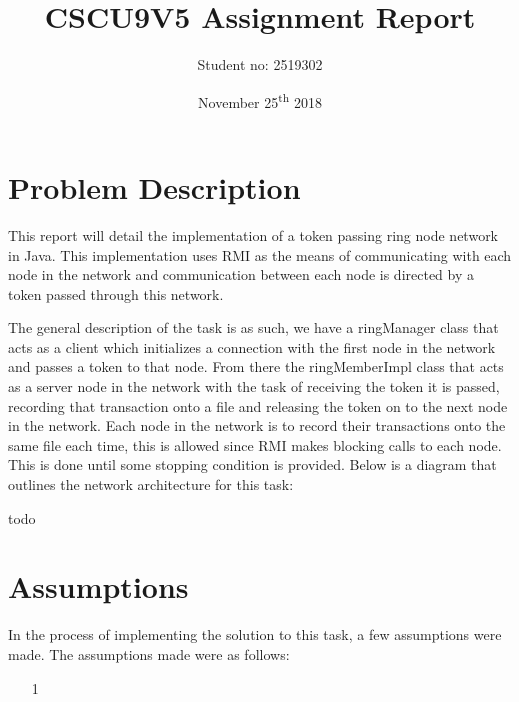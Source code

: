 \documentclass[11pt, a4paper]{report}
\title{CSCU9V5 Assignment Report}
\author{Student no: 2519302}
\date{November 25\textsuperscript{th} 2018}
\begin{document}
\begin{titlepage}
\maketitle
\clearpage\thispagestyle{empty}
\end{titlepage}
\doublespacing
{}
\tableofcontents
\thispagestyle{empty}
\newpage
\singlespacing

\section*{Problem Description}

This report will detail the implementation of a token passing ring node network in Java. This implementation uses RMI as the means of communicating with each node in the network and communication between each node is directed by a token passed through this network. 

The general description of the task is as such, we have a ringManager class that acts as a client which initializes a connection with the first node in the network and passes a token to that node. From there the ringMemberImpl class that acts as a server node in the network with the task of receiving the token it is passed, recording that transaction onto a file and releasing the token on to the next node in the network. Each node in the network is to record their transactions onto the same file each time, this is allowed since RMI makes blocking calls to each node.  This is done until some stopping condition is provided. Below is a diagram that outlines the network architecture for this task:

\begin{center}
todo
\end{center} 

\section*{Assumptions}

In the process of implementing the solution to this task, a few assumptions were made. The assumptions made were as follows:
\begin{itemize}
\item[1] 
\end{itemize}

\end{document}
